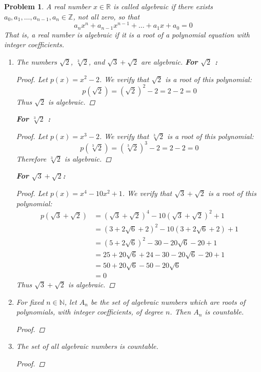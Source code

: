 \documentclass[12pt]{article}
\newtheorem{problem}{Problem}
\newcommand{\NN}{\ensuremath{\mathbb N}}
\newcommand{\RR}{\ensuremath{\mathbb R}}
\newcommand{\ZZ}{\ensuremath{\mathbb Z}}
\begin{document}
\renewcommand{\labelenumi}{(\alph{enumi})}

\begin{problem} %
A real number $x\in\RR$ is called \emph{algebraic} if there exists $a_0, a_1, \dots, a_{n-1}, a_n \in \ZZ$, not all zero, so that
	$$a_n x^n + a_{n-1} x^{n-1} + \dots + a_1 x + a_0 = 0$$
That is, a real number is algebraic if it is a root of a polynomial equation with integer coefficients.

\begin{enumerate}
\item The numbers $\sqrt{2}$, $\sqrt[3]{2}$, and $\sqrt{3} + \sqrt{2}$ are algebraic.
\newline \textbf{For $\sqrt{2}$ :} 
\begin{proof}
Let $p(x) = x^2 - 2$. We verify that $\sqrt{2}$ is a root of this polynomial:
	$$p(\sqrt{2}) = (\sqrt{2})^2 - 2 = 2 - 2  = 0$$
	Thus $\sqrt{2}$ is algebraic.
\end{proof}
\textbf{For $\sqrt[3]{2}$ :}
\begin{proof}
	Let $p(x) = x^3 - 2$. We verify that $\sqrt[3]{2}$ is a root of this polynomial:
	$$p(\sqrt[3]{2}) = (\sqrt[3]{2})^3 - 2 = 2 - 2 = 0$$
	Therefore $\sqrt[3]{2}$ is algebraic.
\end{proof}
\textbf{For $\sqrt{3} + \sqrt{2}$:}
\begin{proof}
	Let $p(x) = x^4 - 10x^2 + 1$. We verify that $\sqrt{3} + \sqrt{2}$ is a root of this polynomial:
	\begin{align*}
		p(\sqrt{3} + \sqrt{2}) &= (\sqrt{3}+\sqrt{2})^4 - 10(\sqrt{3} + \sqrt{2})^2 + 1 \\
													 &= (3 + 2\sqrt{6} + 2)^2 - 10(3 + 2\sqrt{6} + 2) + 1 \\
													 &= (5 + 2\sqrt{6})^2 - 30 - 20\sqrt{6} - 20 + 1 \\
													 &= 25 + 20\sqrt{6} + 24 - 30 - 20\sqrt{6} - 20 + 1 \\
													 &= 50 + 20\sqrt{6} - 50 - 20\sqrt{6} \\
													 &= 0
	\end{align*}
	Thus $\sqrt{3} + \sqrt{2}$ is algebraic.
\end{proof}

\item For fixed $n\in\NN$, let $A_n$ be the set of algebraic numbers which are roots of polynomials, with integer coefficients, of degree $n$.  Then $A_n$ is countable.

\begin{proof}
\end{proof}

\item The set of all algebraic numbers is countable.

\begin{proof}
\end{proof}
\end{enumerate}
\end{problem}
\end{document}
